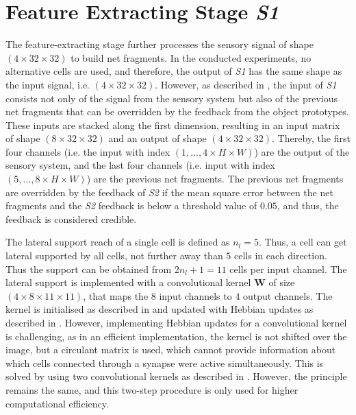 \section{Feature Extracting Stage \emph{S1}}
The feature-extracting stage further processes the sensory signal of shape $(4 \times 32 \times 32)$ to build net fragments. In the conducted experiments, no alternative cells are used, and therefore, the output of \emph{S1} has the same shape as the input signal, i.e. $(4 \times 32 \times 32)$.
However, as described in , the input of \emph{S1} consists not only of the signal from the sensory system but also of the previous net fragments that can be overridden by the feedback from the object prototypes.
These inputs are stacked along the first dimension, resulting in an input matrix of shape $(8 \times 32 \times 32)$ and an output of shape $(4 \times 32 \times 32)$.
Thereby, the first four channels (i.e. the input with index $(1, ..., 4 \times H \times W)$) are the output of the sensory system, and the last four channels (i.e. input with index $(5, ..., 8 \times H \times W)$) are the previous net fragments.
The previous net fragments are overridden by the feedback of \emph{S2} if the mean square error between the net fragments and the \emph{S2} feedback is below a threshold value of $0.05$, and thus, the feedback is considered credible.

The lateral support reach of a single cell is defined as $n_l=5$. Thus, a cell can get lateral supported by all cells, not further away than $5$ cells in each direction. Thus the support can be obtained from $2n_l+1=11$ cells per input channel.
The lateral support is implemented with a convolutional kernel $\boldsymbol{W}$ of size $(4 \times 8 \times 11 \times 11)$, that maps the $8$ input channels to $4$ output channels.
The kernel is initialised as described in  and updated with Hebbian updates as described in .
However, implementing Hebbian updates for a convolutional kernel is challenging, as in an efficient implementation, the kernel is not shifted over the image, but a circulant matrix is used, which cannot provide information about which cells connected through a synapse were active simultaneously. This is solved by using two convolutional kernels as described in . However, the principle remains the same, and this two-step procedure is only used for higher computational efficiency.

